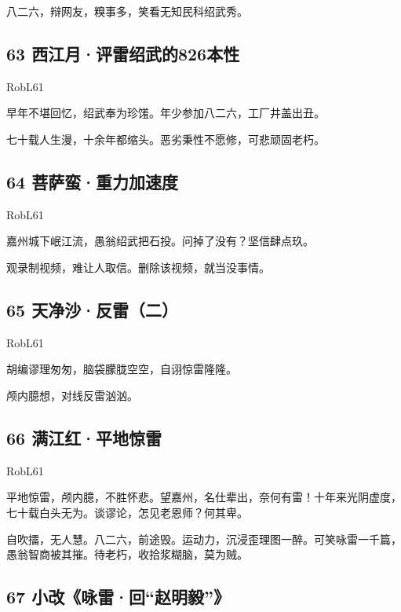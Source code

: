 八二六，辩网友，糗事多，笑看无知民科绍武秀。

\hypertarget{ux897fux6c5fux6708ux8bc4ux96f7ux7ecdux6b66ux7684826ux672cux6027}{%
\subsection{63
西江月·评雷绍武的826本性}\label{ux897fux6c5fux6708ux8bc4ux96f7ux7ecdux6b66ux7684826ux672cux6027}}

RobL61

早年不堪回忆，绍武奉为珍馐。年少参加八二六，工厂井盖出丑。

七十载人生漫，十余年都缩头。恶劣秉性不愿修，可悲顽固老朽。

\hypertarget{ux83e9ux8428ux86eeux91cdux529bux52a0ux901fux5ea6}{%
\subsection{64
菩萨蛮·重力加速度}\label{ux83e9ux8428ux86eeux91cdux529bux52a0ux901fux5ea6}}

RobL61

嘉州城下岷江流，愚翁绍武把石投。问掉了没有？坚信肆点玖。

观录制视频，难让人取信。删除该视频，就当没事情。

\hypertarget{ux5929ux51c0ux6c99ux53cdux96f7ux4e8c}{%
\subsection{65
天净沙·反雷（二）}\label{ux5929ux51c0ux6c99ux53cdux96f7ux4e8c}}

RobL61

胡编谬理匆匆，脑袋朦胧空空，自诩惊雷隆隆。

颅内臆想，对线反雷汹汹。

\hypertarget{ux6ee1ux6c5fux7ea2ux5e73ux5730ux60caux96f7}{%
\subsection{66
满江红·平地惊雷}\label{ux6ee1ux6c5fux7ea2ux5e73ux5730ux60caux96f7}}

RobL61

平地惊雷，颅内臆，不胜怀悲。望嘉州，名仕辈出，奈何有雷！十年来光阴虚度，七十载白头无为。谈谬论，怎见老恩师？何其卑。

自吹擂，无人慧。八二六，前途毁。运动力，沉浸歪理图一醉。可笑咏雷一千篇，愚翁智商被其摧。待老朽，收拾浆糊脑，莫为贼。

\hypertarget{ux5c0fux6539ux548fux96f7ux56deux8d75ux660eux6bc5}{%
\subsection{67
小改《咏雷·回``赵明毅''》}\label{ux5c0fux6539ux548fux96f7ux56deux8d75ux660eux6bc5}}

